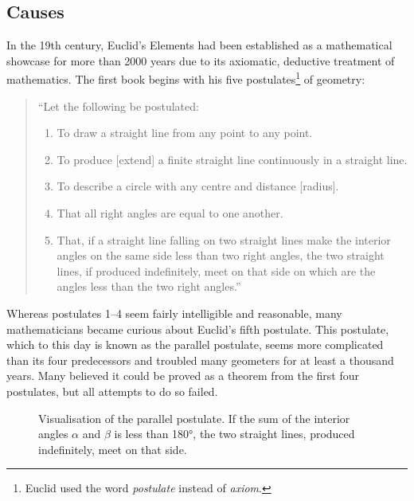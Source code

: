 \documentclass[hidelinks]{article}
\begin{document}
\subsection{Causes}\label{ssec_causes}
In the 19th century, Euclid's Elements had been established as a mathematical showcase for more than 2000 years due to its axiomatic, deductive treatment of mathematics. The first book begins with his five postulates\footnote{Euclid used the word \textit{postulate} instead of \textit{axiom}.} of geometry:
\begin{quote}
``Let the following be postulated:
\begin{enumerate}
\item To draw a straight line from any point to any point.
\item To produce [extend] a finite straight line continuously in a straight line.
\item To describe a circle with any centre and distance [radius].
\item That all right angles are equal to one another.
\item That, if a straight line falling on two straight lines make the interior angles on the same side less than two right angles, the two straight lines, if produced indefinitely, meet on that side on which are the angles less than the two right angles.''
\end{enumerate}
\end{quote}
Whereas postulates 1--4 seem fairly intelligible and reasonable, many mathematicians became curious about Euclid's fifth postulate. This postulate, which to this day is known as the parallel postulate, seems more complicated than its four predecessors and troubled many geometers for at least a thousand years. Many believed it could be proved as a theorem from the first four postulates, but all attempts to do so failed. 

\begin{figure}[h]
	\centering
{}
	\caption{Visualisation of the parallel postulate. If the sum of the interior angles $\alpha$ and $\beta$ is less than 180°, the two straight lines, produced indefinitely, meet on that side.}
\end{figure}
\end{document}
